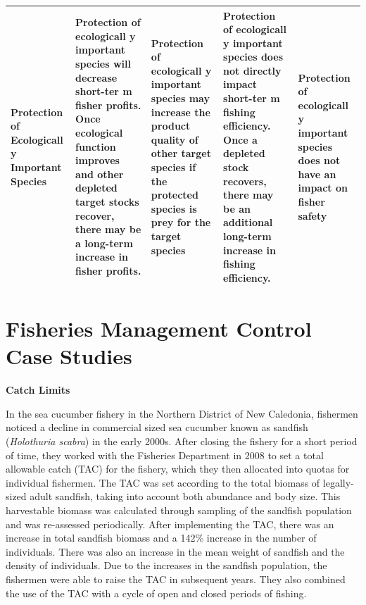 \documentclass[]{book}
\begin{document}
\begin{longtable}[]{@{}lllll@{}}
\begin{minipage}[t]{0.17\columnwidth}
Protection of Ecologicall y Important Species\strut
\end{minipage} & \begin{minipage}[t]{0.17\columnwidth}\raggedright\strut
Protection of ecologicall y important species will decrease
\textbf{short-ter m} fisher profits. Once ecological function improves
and other depleted target stocks recover, there may be a
\textbf{long-term } increase in fisher profits.\strut
\end{minipage} & \begin{minipage}[t]{0.17\columnwidth}\raggedright\strut
Protection of ecologicall y important species may increase the product
quality of other target species if the protected species is prey for the
target species\strut
\end{minipage} & \begin{minipage}[t]{0.17\columnwidth}\raggedright\strut
Protection of ecologicall y important species does not directly impact
\textbf{short-ter m} fishing efficiency. Once a depleted stock recovers,
there may be an additional \textbf{long-term } increase in fishing
efficiency.\strut
\end{minipage} & \begin{minipage}[t]{0.17\columnwidth}\raggedright\strut
Protection of ecologicall y important species does not have an impact on
fisher safety\strut
\end{minipage}\tabularnewline
\bottomrule
\end{longtable}

\hypertarget{case-studies}{\section{Fisheries Management Control Case
Studies}\label{case-studies}}

\textbf{Catch Limits}

In the sea cucumber fishery in the Northern District of New Caledonia,
fishermen noticed a decline in commercial sized sea cucumber known as
sandfish (\emph{Holothuria scabra}) in the early 2000s. After closing
the fishery for a short period of time, they worked with the Fisheries
Department in 2008 to set a total allowable catch (TAC) for the fishery,
which they then allocated into quotas for individual fishermen. The TAC
was set according to the total biomass of legally-sized adult sandfish,
taking into account both abundance and body size. This harvestable
biomass was calculated through sampling of the sandfish population and
was re-assessed periodically. After implementing the TAC, there was an
increase in total sandfish biomass and a 142\% increase in the number of
individuals. There was also an increase in the mean weight of sandfish
and the density of individuals. Due to the increases in the sandfish
population, the fishermen were able to raise the TAC in subsequent
years. They also combined the use of the TAC with a cycle of open and
closed periods of fishing.
\end{document}
